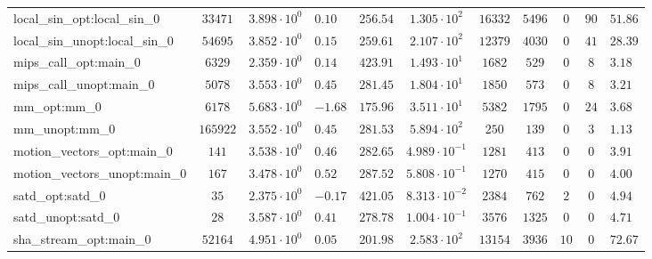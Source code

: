 \begin{tabular}{|l|c|HHc|c|c|c|c|cH|}
local\_sin\_opt:local\_sin\_0                   & $ 33471    $ & $ 3.898 \cdot 10^{0} $ & $ 0.10  $ & $ 256.54 $ & $ 1.305 \cdot 10^{2}  $ & $ 16332  $ & $ 5496  $ & $ 0   $ & $ 90  $ & $ 51.86   $ \\
local\_sin\_unopt:local\_sin\_0                 & $ 54695    $ & $ 3.852 \cdot 10^{0} $ & $ 0.15  $ & $ 259.61 $ & $ 2.107 \cdot 10^{2}  $ & $ 12379  $ & $ 4030  $ & $ 0   $ & $ 41  $ & $ 28.39   $ \\
mips\_call\_opt:main\_0                         & $ 6329     $ & $ 2.359 \cdot 10^{0} $ & $ 0.14  $ & $ 423.91 $ & $ 1.493 \cdot 10^{1}  $ & $ 1682   $ & $ 529   $ & $ 0   $ & $ 8   $ & $ 3.18    $ \\
mips\_call\_unopt:main\_0                       & $ 5078     $ & $ 3.553 \cdot 10^{0} $ & $ 0.45  $ & $ 281.45 $ & $ 1.804 \cdot 10^{1}  $ & $ 1850   $ & $ 573   $ & $ 0   $ & $ 8   $ & $ 3.21    $ \\
mm\_opt:mm\_0                                   & $ 6178     $ & $ 5.683 \cdot 10^{0} $ & $ -1.68 $ & $ 175.96 $ & $ 3.511 \cdot 10^{1}  $ & $ 5382   $ & $ 1795  $ & $ 0   $ & $ 24  $ & $ 3.68    $ \\
mm\_unopt:mm\_0                                 & $ 165922   $ & $ 3.552 \cdot 10^{0} $ & $ 0.45  $ & $ 281.53 $ & $ 5.894 \cdot 10^{2}  $ & $ 250    $ & $ 139   $ & $ 0   $ & $ 3   $ & $ 1.13    $ \\
motion\_vectors\_opt:main\_0                    & $ 141      $ & $ 3.538 \cdot 10^{0} $ & $ 0.46  $ & $ 282.65 $ & $ 4.989 \cdot 10^{-1} $ & $ 1281   $ & $ 413   $ & $ 0   $ & $ 0   $ & $ 3.91    $ \\
motion\_vectors\_unopt:main\_0                  & $ 167      $ & $ 3.478 \cdot 10^{0} $ & $ 0.52  $ & $ 287.52 $ & $ 5.808 \cdot 10^{-1} $ & $ 1270   $ & $ 415   $ & $ 0   $ & $ 0   $ & $ 4.00    $ \\
satd\_opt:satd\_0                               & $ 35       $ & $ 2.375 \cdot 10^{0} $ & $ -0.17 $ & $ 421.05 $ & $ 8.313 \cdot 10^{-2} $ & $ 2384   $ & $ 762   $ & $ 2   $ & $ 0   $ & $ 4.94    $ \\
satd\_unopt:satd\_0                             & $ 28       $ & $ 3.587 \cdot 10^{0} $ & $ 0.41  $ & $ 278.78 $ & $ 1.004 \cdot 10^{-1} $ & $ 3576   $ & $ 1325  $ & $ 0   $ & $ 0   $ & $ 4.71    $ \\
sha\_stream\_opt:main\_0                        & $ 52164    $ & $ 4.951 \cdot 10^{0} $ & $ 0.05  $ & $ 201.98 $ & $ 2.583 \cdot 10^{2}  $ & $ 13154  $ & $ 3936  $ & $ 10  $ & $ 0   $ & $ 72.67   $ \\

\end{tabular}
